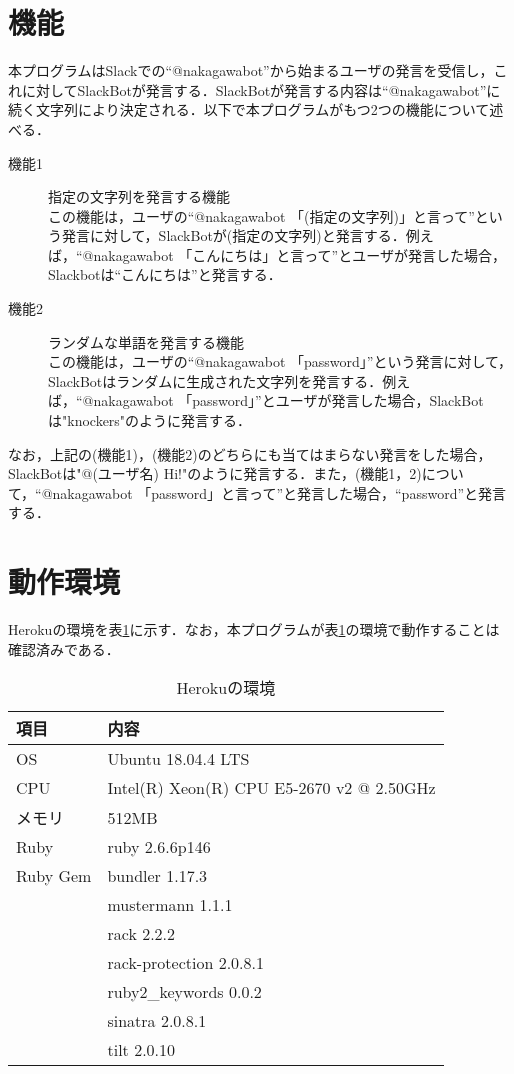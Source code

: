 \documentclass[12pt]{jsarticle}
\begin{document}
\section{機能}\label{sec:function}
本プログラムはSlackでの``@nakagawabot''から始まるユーザの発言を受信し，これに対してSlackBotが発言する．SlackBotが発言する内容は``@nakagawabot''に続く文字列により決定される．以下で本プログラムがもつ2つの機能について述べる．
\begin{description}
\item[機能1] 指定の文字列を発言する機能\\
  この機能は，ユーザの``@nakagawabot 「(指定の文字列)」と言って''という発言に対して，SlackBotが(指定の文字列)と発言する．例えば，``@nakagawabot 「こんにちは」と言って''とユーザが発言した場合，Slackbotは``こんにちは''と発言する．\label{func1}
\item[機能2] ランダムな単語を発言する機能\\
  この機能は，ユーザの``@nakagawabot 「password」''という発言に対して，SlackBotはランダムに生成された文字列を発言する．例えば，``@nakagawabot 「password」''とユーザが発言した場合，SlackBotは"knockers"のように発言する．
\end{description}
なお，上記の(機能1)，(機能2)のどちらにも当てはまらない発言をした場合，SlackBotは"@(ユーザ名) Hi!"のように発言する．また，(機能1，2)について，``@nakagawabot 「password」と言って''と発言した場合，``password''と発言する．

\section{動作環境}\label{sec:env}
Herokuの環境を表\ref{tab:1}に示す．なお，本プログラムが表\ref{tab:1}の環境で動作することは確認済みである．
\begin{table}[h]
  \begin{center}
    \caption{Herokuの環境}\label{tab:1}
    \begin{tabular}{l|l}
      \hline\hline
      \multicolumn{1}{l|}{項目} & \multicolumn{1}{l}{内容}\\
      \hline
      OS & Ubuntu 18.04.4 LTS\\
      CPU & Intel(R) Xeon(R) CPU E5-2670 v2 @ 2.50GHz\\
      メモリ & 512MB\\
      Ruby & ruby 2.6.6p146\\
      Ruby Gem & bundler 1.17.3\\
      & mustermann 1.1.1\\
      & rack 2.2.2\\
      & rack-protection 2.0.8.1\\
      & ruby2\_keywords 0.0.2\\
      & sinatra 2.0.8.1\\
      & tilt 2.0.10\\
      \hline
    \end{tabular}
  \end{center}
\end{table}
\end{document}
